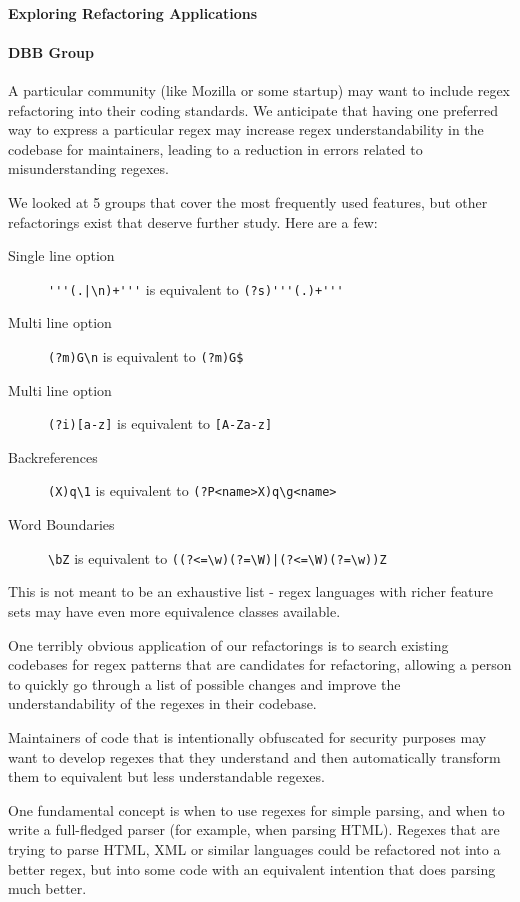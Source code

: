 \paragraph{Exploring Refactoring Applications}

\paragraph{DBB Group}

A particular community (like Mozilla or some startup) may want to include regex refactoring into their coding standards.  We anticipate that having one preferred way to express a particular regex may increase regex understandability in the codebase for maintainers, leading to a reduction in errors related to misunderstanding regexes.

We looked at 5 groups that cover the most frequently used features, but other refactorings exist that deserve further study.  Here are a few:
\begin{description}
\item[Single line option]  \verb!'''(.|\n)+'''! is equivalent to \verb!(?s)'''(.)+'''!
\item[Multi line option]  \verb!(?m)G\n! is equivalent to \verb!(?m)G$!
\item[Multi line option]  \verb!(?i)[a-z]! is equivalent to \verb![A-Za-z]!
\item[Backreferences]  \verb!(X)q\1! is equivalent to \verb!(?P<name>X)q\g<name>!
\item[Word Boundaries]  \verb!\bZ! is equivalent to \verb!((?<=\w)(?=\W)|(?<=\W)(?=\w))Z!
\end{description}

This is not meant to be an exhaustive list - regex languages with richer feature sets may have even more equivalence classes available.

One terribly obvious application of our refactorings is to search existing codebases for regex patterns that are candidates for refactoring, allowing a person to quickly go through a list of possible changes and improve the understandability of the regexes in their codebase.

Maintainers of code that is intentionally obfuscated for security purposes may want to develop regexes that they understand and then automatically transform them to equivalent but less understandable regexes.

One fundamental concept is when to use regexes for simple parsing, and when to write a full-fledged parser (for example, when parsing HTML).  Regexes that are trying to parse HTML, XML or similar languages could be refactored not into a better regex, but into some code with an equivalent intention that does parsing much better.

